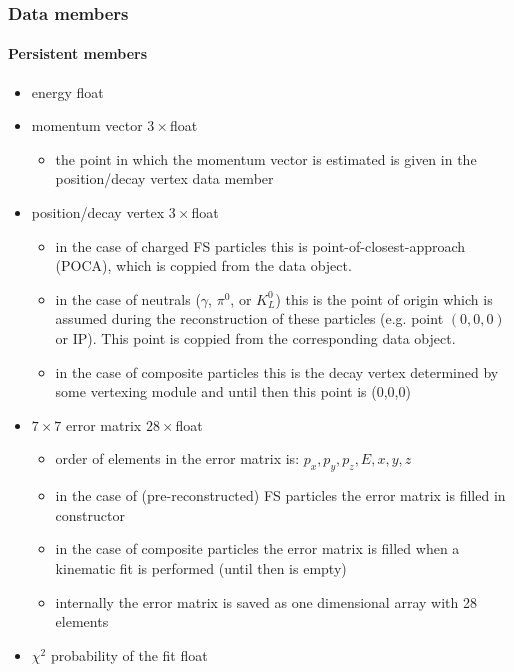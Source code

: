 \subsubsection{Data members}

\paragraph{Persistent members} 
\begin{itemize}
 \item {\color{blue}energy} \hfill{float}
 \item {\color{blue}momentum vector} \hfill{$3\times$float}
 \begin{itemize}
  \item the point in which the momentum vector is estimated is given in the position/decay vertex data member
 \end{itemize}
 \item {\color{blue}position/decay vertex} \hfill{$3\times$float}
 \begin{itemize}
  \item in the case of charged FS particles this is point-of-closest-approach (POCA), which is coppied from the \track data object.
  \item in the case of neutrals ($\gamma$, $\pi^0$, or $K^0_L$) this is the point of origin which is assumed during the 
  reconstruction of these particles (e.g. point $(0,0,0)$ or IP). This point is  coppied from the corresponding \mdst data object. 
  \item in the case of composite particles this is the decay vertex determined by some vertexing module and until then this point is (0,0,0)
 \end{itemize}
 \item {\color{blue}$7\times7$ error matrix} \hfill{$28\times$float}
 \begin{itemize}
  \item order of elements in the error matrix is: $p_x, p_y, p_z, E, x, y, z$
  \item in the case of (pre-reconstructed) FS particles the error matrix is filled in \particle constructor
  \item in the case of composite particles the error matrix is filled when a kinematic fit is performed (until then is empty)
  \item internally the error matrix is saved as one dimensional array with 28 elements
 \end{itemize}
 \item {\color{blue}$\chi^2$ probability of the fit} \hfill{float}

\end{itemize}
